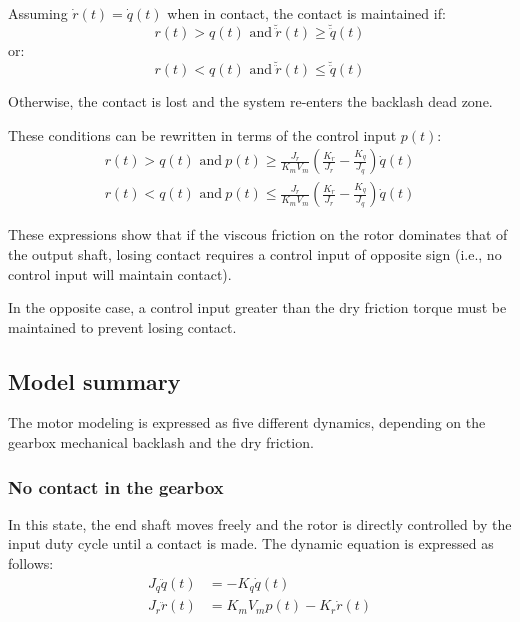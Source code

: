 \documentclass[english,12pt,a4paper]{article}
\begin{document}
\begin{itemize}
			Assuming $\dot{r}(t) = \dot{q}(t)$ when in contact, the contact is maintained if:
			\begin{equation}
				r(t) > q(t) \text{ and}\ \breve{\ddot{r}}(t) \ge \breve{\ddot{q}}(t)
			\end{equation}
			or:
			\begin{equation}
				r(t) < q(t) \text{ and}\ \breve{\ddot{r}}(t) \le \breve{\ddot{q}}(t)
			\end{equation}
			
			Otherwise, the contact is lost and the system re-enters the backlash dead zone.
			
			These conditions can be rewritten in terms of the control input $p(t)$:
			\begin{align}
				r(t)>q(t) \text{ and}\ p(t) \ge \frac{J_r}{K_m V_m} \left( \frac{K_r}{J_r} - \frac{K_q}{J_q}  \right) \dot{q}(t) \\
				r(t)<q(t) \text{ and}\ p(t) \le \frac{J_r}{K_m V_m} \left( \frac{K_r}{J_r} - \frac{K_q}{J_q}  \right) \dot{q}(t)
			\end{align}
			
			These expressions show that if the viscous friction on the rotor dominates that of the output shaft, losing contact requires a control input of opposite sign (i.e., no control input will maintain contact).
			
			In the opposite case, a control input greater than the dry friction torque must be maintained to prevent losing contact.
			
		\end{itemize}
		
	\subsection{Model summary}
	
		The motor modeling is expressed as five different dynamics, depending on the gearbox mechanical backlash and the dry friction.
		
		
		\subsubsection{No contact in the gearbox}
			In this state, the end shaft moves freely and the rotor is directly controlled by the input duty cycle until a contact is made. The dynamic equation is expressed as follows:
			\begin{align}
				J_q \ddot{q}(t) &= - K_q \dot{q}(t) \\
				J_r \ddot{r}(t) &= K_m V_m p(t) - K_r \dot{r}(t)
			\end{align}	
			
\end{document}

